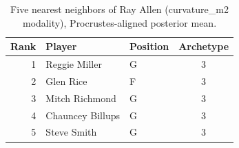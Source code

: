 \begin{table}[htbp]
  \centering\small
  \begin{tabular}{rllc}
    \toprule
    Rank & Player & Position & Archetype \\
    \midrule
    1 & Reggie Miller & G & 3 \\
    2 & Glen Rice & F & 3 \\
    3 & Mitch Richmond & G & 3 \\
    4 & Chauncey Billups & G & 3 \\
    5 & Steve Smith & G & 3 \\
    \bottomrule
  \end{tabular}
  \caption{Five nearest neighbors of Ray Allen (curvature_m2 modality), Procrustes-aligned posterior mean.}
  \label{tab:Ray_Allen_neighbors_curvature_m2}
\end{table}

